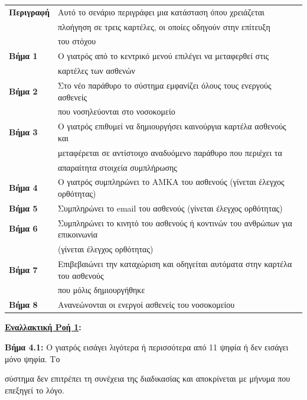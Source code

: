 \documentclass{article}
\newcommand\T{\rule{0pt}{2.6ex}}       %
\newcommand\B{\rule[-1.2ex]{0pt}{0pt}}
\begin{document}
  \begin{center}
     \begin{tabular}{|l|l|}
     \hline
      \textbf{Περιγραφή} & Αυτό το σενάριο περιγράφει μια κατάσταση όπου χρειάζεται \T \\& πλοήγηση σε τρεις καρτέλες, οι οποίες οδηγούν στην επίτευξη \\& του στόχου \B \\ 
      \hline
      \textbf{Βήμα 1} & Ο γιατρός από το κεντρικό μενού επιλέγει να μεταφερθεί στις \T \\& καρτέλες των ασθενών \B \\
      \hline
      \textbf{Βήμα 2} & Στο νέο παράθυρο το σύστημα εμφανίζει όλους τους ενεργούς ασθενείς
      \T \\& που νοσηλεύονται στο νοσοκομείο \B\\
      \hline
      \textbf{Βήμα 3} & Ο γιατρός επιθυμεί να δημιουργήσει καινούργια καρτέλα ασθενούς και \T \\& μεταφέρεται σε αντίστοιχο αναδυόμενο παράθυρο που περιέχει τα \\& απαραίτητα στοιχεία συμπλήρωσης \B \\
      \hline
      \textbf{Βήμα 4} & Ο γιατρός συμπληρώνει το ΑΜΚΑ του ασθενούς (γίνεται έλεγχος ορθότητας) \T\B \\
      \hline
      \textbf{Βήμα 5} & Συμπληρώνει το email του ασθενούς (γίνεται έλεγχος ορθότητας) \T\B \\
      \hline
      \textbf{Βήμα 6} & Συμπληρώνει το κινητό του ασθενούς ή κοντινών του ανθρώπων για επικοινωνία \T \\& (γίνεται έλεγχος ορθότητας) \B \\
      \hline
      \textbf{Βήμα 7} & Επιβεβαιώνει την καταχώριση και οδηγείται αυτόματα στην καρτέλα του ασθενούς \T \\& που μόλις δημιουργήθηκε \B \\
      \hline
      \textbf{Βήμα 8} & Ανανεώνονται οι ενεργοί ασθενείς του νοσοκομείου \T\B \\
      \hline
     \end{tabular}
 \end{center}
 
 \textbf{\underline{Εναλλακτική Ροή 1}:} \vspace{0.2cm}
\par \textbf{Βήμα 4.1:} Ο γιατρός εισάγει λιγότερα ή περισσότερα από 11 ψηφία ή δεν εισάγει μόνο ψηφία. Το \par σύστημα δεν επιτρέπει τη συνέχεια της διαδικασίας και αποκρίνεται με μήνυμα που επεξηγεί το λόγο.  \vspace{0.2cm}
\end{document}
